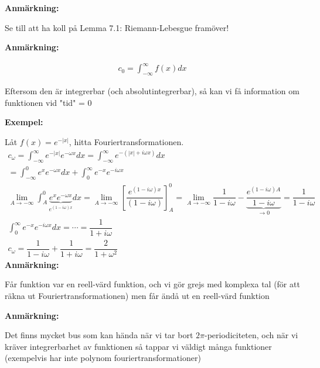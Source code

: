 \par\bigskip
\noindent\textbf{Anmärkning:}\par
\noindent Se till att ha koll på Lemma 7.1: Riemann-Lebesgue framöver!
\par\bigskip
\noindent\textbf{Anmärkning:}\par
\begin{equation*}
  \begin{gathered}
    c_0 = \int_{-\infty}^{\infty}f(x)dx
  \end{gathered}
\end{equation*}
\par\bigskip
\noindent Eftersom den är integrerbar (och absolutintegrerbar), så kan vi få information om funktionen vid "tid" = 0 
\par\bigskip
\noindent\textbf{Exempel:}\par
\noindent Låt $f(x) = e^{-\left|x\right|}$, hitta Fouriertransformationen.
\begin{equation*}
  \begin{gathered}
    c_\omega = \int_{-\infty}^{\infty}e^{-\left|x\right|}e^{-\omega x}dx = \int_{-\infty}^{\infty}e^{-(\left|x\right|+i\omega x)} dx\\
    = \int_{-\infty}^{0}e^{x}e^{-\omega x}dx + \int_{0}^{\infty}e^{-x}e^{-i\omega x}\\
    \lim_{A\to-\infty}\int_{A}^{0}\underbrace{e^{x}e^{-\omega x}}_{\text{$e^{(1-i\omega)x}$}}dx = \lim_{A\to-\infty}\left[\dfrac{e^{(1-i\omega)x}}{(1-i\omega)}\right]_{A}^0 = \lim_{A\to-\infty}\dfrac{1}{1-i\omega}-\underbrace{\dfrac{e^{(1-i\omega)A}}{1-i\omega}}_{\text{$\to0$}} = \dfrac{1}{1-i\omega}\\
    \int_{0}^{\infty}e^{-x}e^{-i\omega x}dx = \cdots = \dfrac{1}{1+i\omega}\\
    c_\omega = \dfrac{1}{1-i\omega} + \dfrac{1}{1+i\omega} = \dfrac{2}{1+\omega^2}
  \end{gathered}
\end{equation*}
\newpage
\noindent\textbf{Anmärkning:}\par
\noindent Får funktion var en reell-värd funktion, och vi gör grejs med komplexa tal (för att räkna ut Fouriertransformationen) men får ändå ut en reell-värd funktion
\par\bigskip
\noindent\textbf{Anmärkning:}\par
\noindent Det finns mycket bus som kan hända när vi tar bort $2\pi$-periodiciteten, och när vi kräver integrerbarhet av funktionen så tappar vi väldigt många funktioner (exempelvis har inte polynom fouriertransformationer)
